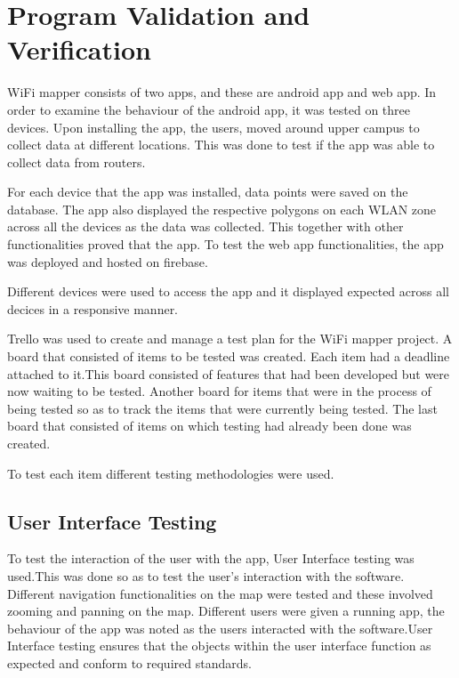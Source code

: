 \section{Program Validation and Verification}
\label{ss:progr-valid-verif}


WiFi mapper consists of two apps, and these are android app and web app. In order to examine the behaviour of the android app, it was tested on three devices. Upon installing the app, the users, moved around upper campus to collect data at different locations. This was done to test if the app was able to collect data from routers.

For each device that the app was installed, data points were saved on the database. The app also displayed the respective polygons on each WLAN zone across all the devices as the data was collected. This together with other functionalities proved that the app. To test the web app functionalities, the app was deployed and hosted on firebase.

Different devices were used to access the app and it displayed expected across all decices in a responsive manner.



Trello was used to create and manage a test plan for the WiFi mapper project. A board that consisted of items to be tested was created. Each item had a deadline attached to it.This board consisted of features that had been developed but were now waiting to be tested. Another board for items that were in the process of being tested so as to track the items  that were currently being tested. The last board that consisted of items on which testing had already been done was created.

To test each item different testing methodologies were used.

\subsection*{User Interface Testing}
To test the interaction of the user with the app, User Interface testing was used.This was done so as to test the user's interaction with the software. Different navigation functionalities on the map were tested and these involved zooming and panning on the map. Different users were given a running app, the behaviour of the app was noted as the users interacted with the software.User Interface testing ensures that the objects within the user interface function as expected and conform to required standards.

